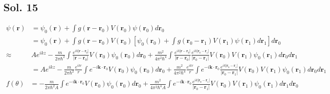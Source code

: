 \subsection*{Sol. 15}
\begin{align*}
    \psi(\bm r) & = \psi_0(\bm r) + \int g(\bm r -\bm r_0)V(\bm r_0)\psi(\bm r_0)d\bm r_0 \\
                & =
    \psi_0(\bm r) + \int g(\bm r -\bm r_0)V(\bm r_0)
    \left[
        \psi_0(\bm r_0) +
        \int g(\bm r_0 -\bm r_1)V(\bm r_1)\psi(\bm r_1)d\bm r_1
        \right]
    d\bm r_0 \\
    \approx     &
    Ae^{ikz}-\frac{m}{2\pi\hbar^2}
    \int\frac{e^{ik|\bm r-\bm r_0|}}{|\bm r - \bm r_0|}
    V(\bm r_0)\psi_0(\bm r_0)d\bm r_0
    +\frac{m^2}{4\pi^2\hbar^4}\int
    \frac{e^{ik|\bm r-\bm r_0|}}{|\bm r - \bm r_0|}
    \frac{e^{ik|\bm r_0-\bm r_1|}}{|\bm r_0 - \bm r_1|}
    V(\bm r_0)V(\bm r_1)\psi_0(\bm r_1)d\bm r_0d\bm r_1 \\
                & =
    Ae^{ikz}-\frac{m}{2\pi\hbar^2}
    \frac{e^{ikr}}{r}
    \int e^{-i\bm k \cdot \bm r_0}
    V(\bm r_0)\psi_0(\bm r_0)d\bm r_0
    +\frac{m^2}{4\pi^2\hbar^4}\frac{e^{ikr}}{r}
    \int e^{-i\bm k \cdot \bm r_0}
    \frac{e^{ik|\bm r_0-\bm r_1|}}{|\bm r_0 - \bm r_1|}
    V(\bm r_0)V(\bm r_1)\psi_0(\bm r_1)d\bm r_0d\bm r_1
\end{align*}
\begin{align*}
    f(\theta) & =
    -\frac{m}{2\pi\hbar^2A}
    \int e^{-i\bm k \cdot \bm r_0}
    V(\bm r_0)\psi_0(\bm r_0)d\bm r_0
    +\frac{m^2}{4\pi^2\hbar^4A}
    \int e^{-i\bm k \cdot \bm r_0}
    \frac{e^{ik|\bm r_0-\bm r_1|}}{|\bm r_0 - \bm r_1|}
    V(\bm r_0)V(\bm r_1)\psi_0(\bm r_1)d\bm r_1d\bm r_0
\end{align*}

